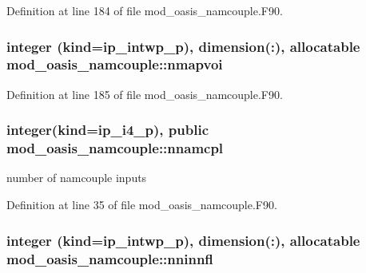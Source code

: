 Definition at line 184 of file mod\+\_\+oasis\+\_\+namcouple.\+F90.

\hypertarget{classmod__oasis__namcouple_adb1f8ce6bf94f488c10ef36b3afb8eca}{
\subsubsection[{nmapvoi}]{\setlength{\rightskip}{0pt plus 5cm}integer (kind=ip\+\_\+intwp\+\_\+p), dimension(\+:), allocatable mod\+\_\+oasis\+\_\+namcouple\+::nmapvoi\hspace{0.3cm}{\ttfamily [private]}}}\label{classmod__oasis__namcouple_adb1f8ce6bf94f488c10ef36b3afb8eca}


Definition at line 185 of file mod\+\_\+oasis\+\_\+namcouple.\+F90.

\hypertarget{classmod__oasis__namcouple_a5ca7cd6a5b9f939b68492200aa92bab4}{
\subsubsection[{nnamcpl}]{\setlength{\rightskip}{0pt plus 5cm}integer(kind=ip\+\_\+i4\+\_\+p), public mod\+\_\+oasis\+\_\+namcouple\+::nnamcpl}}\label{classmod__oasis__namcouple_a5ca7cd6a5b9f939b68492200aa92bab4}


number of namcouple inputs 



Definition at line 35 of file mod\+\_\+oasis\+\_\+namcouple.\+F90.

\hypertarget{classmod__oasis__namcouple_a579387e570e26f2d6c6c2159824cf8a3}{
\subsubsection[{nninnfl}]{\setlength{\rightskip}{0pt plus 5cm}integer (kind=ip\+\_\+intwp\+\_\+p), dimension(\+:), allocatable mod\+\_\+oasis\+\_\+namcouple\+::nninnfl\hspace{0.3cm}{\ttfamily [private]}}}\label{classmod__oasis__namcouple_a579387e570e26f2d6c6c2159824cf8a3}


